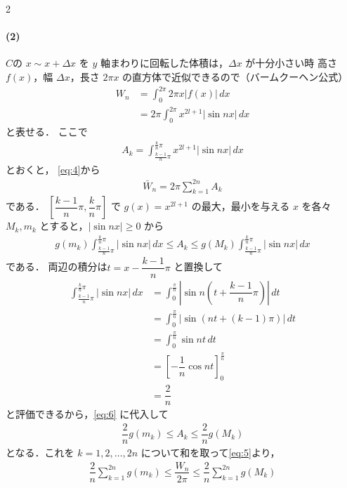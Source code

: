 \documentclass[../../main.tex]{subfiles}
\begin{document}
\begin{multicols}{2}
  \paragraph{(2)}

  $C$の $x \sim x+\Delta x$ を $y$ 軸まわりに回転した体積は，$\Delta x$ が十分小さい時
  高さ $f(x)$，幅 $\Delta x$，長さ $2\pi x$ の直方体で近似できるので（バームクーヘン公式）
  \begin{align}
    W_n
    & = \int_0^{2\pi} 2\pi x |f(x)| \, dx                               \\
    & = 2\pi \int_0^{2\pi} x^{2l+1} |\sin nx| \, dx \label{eq:4}
  \end{align}
  と表せる．
  ここで
  \begin{align}
    A_k = \int_{\frac{k-1}{n}\pi}^{\frac{k}{n}\pi} x^{2l+1} |\sin nx| \, dx
  \end{align}
  とおくと，
  \cref{eq:4}から
  \begin{align}
    \bar{W}_n = 2\pi \sum_{k=1}^{2n} A_k \label{eq:5}
  \end{align}
  である．
  $\left[ \dfrac{k-1}{n}\pi, \dfrac{k}{n}\pi \right]$ で $g(x) = x^{2l+1}$ の最大，最小を与える $x$ を各々 $M_k, m_k$
  とすると，$|\sin nx| \ge 0$ から
  \begin{align}
    g(m_k) \int_{\frac{k-1}{n}\pi}^{\frac{k}{n}\pi} |\sin nx| \, dx \le A_k \le g(M_k) \int_{\frac{k-1}{n}\pi}^{\frac{k}{n}\pi} |\sin nx| \, dx \label{eq:6}
  \end{align}
  である．
  両辺の積分は$t = x - \dfrac{k-1}{n}\pi$ と置換して
  \begin{align}
    \int_{\frac{k-1}{n}\pi}^{\frac{k}{n}\pi} |\sin nx| \, dx
    & = \int_0^{\frac{\pi}{n}} |\sin n(t + \dfrac{k-1}{n}\pi)| \, dt \\
    & = \int_0^{\frac{\pi}{n}} |\sin (nt + (k-1)\pi)| \, dt         \\
    & = \int_0^{\frac{\pi}{n}} \sin nt \, dt                        \\
    & = \left[ -\dfrac{1}{n}\cos nt \right]_0^{\frac{\pi}{n}}        \\
    & =  \dfrac{2}{n}
  \end{align}
  と評価できるから，\cref{eq:6} に代入して
  \begin{align}
    \dfrac{2}{n} g(m_k) \le A_k \le \dfrac{2}{n} g(M_k)
  \end{align}
  となる．これを $k=1, 2, \dots, 2n$ について和を取って\cref{eq:5}より，
  \begin{align}
    \dfrac{2}{n} \sum_{k=1}^{2n} g(m_k) \le \dfrac{W_n}{2\pi} \le \dfrac{2}{n} \sum_{k=1}^{2n} g(M_k)\label{eq:7}

\end{align}
\end{multicols}
\end{document}
